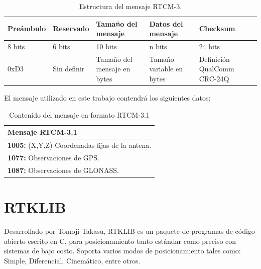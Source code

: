 \begin{table}[!htb]
\begin{center}
\caption{Estructura del mensaje RTCM-3.}
\label{Tab:RTCM-Struct}
\begin{tabular}{|l|l|l|l|l|}
	\hline
	\textbf{Preámbulo} & \textbf{Reservado} & \textbf{\small Tamaño del mensaje} & \textbf{\small Datos del mensaje} & \textbf{Checksum}\\
	\hline
	8 bits & 6 bits & 10 bits & n bits & 24 bits \\
	\hline
	0xD3 & \parbox[t]{1.9cm}{Sin definir} & \parbox[t]{2.9cm}{Tamaño del mensaje en bytes} & \parbox[t]{2.9cm}{Tamaño variable en bytes} & \parbox[t]{2.05cm}{Definición QualComm CRC-24Q}\\
	\hline
\end{tabular}
\end{center}
\end{table}

El mensaje utilizado en este trabajo contendrá los siguientes datos: \\

\begin{table}[!htb]
\begin{center}
\caption{Contenido del mensaje en formato RTCM-3.1}
\begin{tabular}{|l|}
	\hline
	\textbf{Mensaje RTCM-3.1}\\
	\hline
	\tabitem \textbf{1005:} (X,Y,Z) Coordenadas fijas de la antena. \\
	\tabitem \textbf{1077:} Observaciones de GPS. \\
	\tabitem \textbf{1087:} Observaciones de GLONASS.\footnotemark \\
	\hline
\end{tabular}
\end{center}
\end{table}


\section{RTKLIB}

Desarrollado por Tomoji Takasu, RTKLIB es un paquete de programas de código abierto escrito en C, para posicionamiento tanto estándar como preciso con sistemas de bajo costo. Soporta varios modos de posicionamiento tales como: Simple, Diferencial, Cinemático, entre otros. \\

